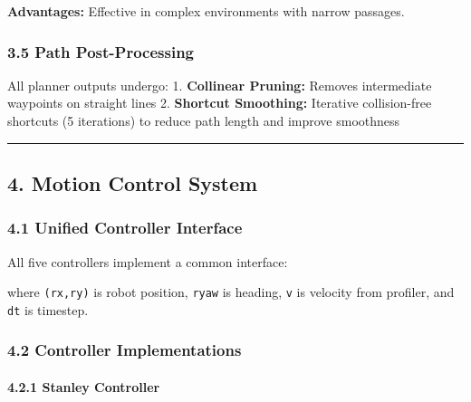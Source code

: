 \textbf{Advantages:} Effective in complex environments with narrow
passages.

\hypertarget{path-post-processing}{%
\subsubsection{3.5 Path Post-Processing}\label{path-post-processing}}

All planner outputs undergo: 1. \textbf{Collinear Pruning:} Removes
intermediate waypoints on straight lines 2. \textbf{Shortcut Smoothing:}
Iterative collision-free shortcuts (5 iterations) to reduce path length
and improve smoothness

\begin{center}\rule{0.5\linewidth}{0.5pt}\end{center}

\hypertarget{motion-control-system}{%
\subsection{4. Motion Control System}\label{motion-control-system}}

\hypertarget{unified-controller-interface}{%
\subsubsection{4.1 Unified Controller
Interface}\label{unified-controller-interface}}

All five controllers implement a common interface:

\begin{Shaded}
\begin{Highlighting}[]
    \OperatorTok{{-}\textgreater{}}
\end{Highlighting}
\end{Shaded}

where \texttt{(rx,ry)} is robot position, \texttt{ryaw} is heading,
\texttt{v} is velocity from profiler, and \texttt{dt} is timestep.

\hypertarget{controller-implementations}{%
\subsubsection{4.2 Controller
Implementations}\label{controller-implementations}}

\hypertarget{stanley-controller}{%
\paragraph{4.2.1 Stanley Controller}\label{stanley-controller}}


